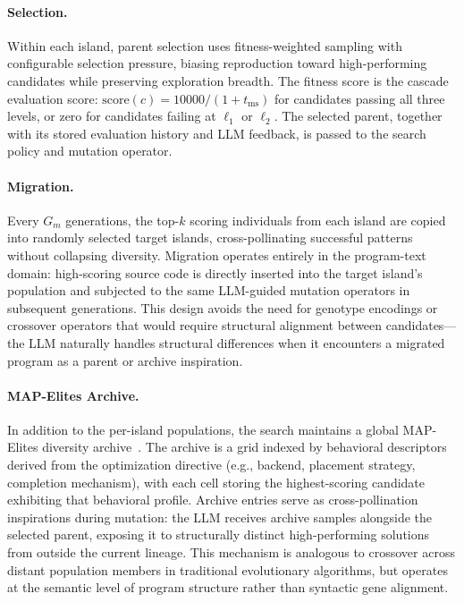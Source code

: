 \paragraph{Selection.}
Within each island, parent selection uses fitness-weighted sampling with configurable selection pressure, biasing reproduction toward high-performing candidates while preserving exploration breadth. The fitness score is the cascade evaluation score: $\text{score}(c) = 10000 / (1 + t_{\text{ms}})$ for candidates passing all three levels, or zero for candidates failing at $\ell_1$ or $\ell_2$. The selected parent, together with its stored evaluation history and LLM feedback, is passed to the search policy and mutation operator.

\paragraph{Migration.}
Every $G_m$ generations, the top-$k$ scoring individuals from each island are copied into randomly selected target islands, cross-pollinating successful patterns without collapsing diversity. Migration operates entirely in the program-text domain: high-scoring source code is directly inserted into the target island's population and subjected to the same LLM-guided mutation operators in subsequent generations. This design avoids the need for genotype encodings or crossover operators that would require structural alignment between candidates---the LLM naturally handles structural differences when it encounters a migrated program as a parent or archive inspiration.

\paragraph{MAP-Elites Archive.}
In addition to the per-island populations, the search maintains a global MAP-Elites diversity archive~\cite{mapelites}. The archive is a grid indexed by behavioral descriptors derived from the optimization directive (e.g., backend, placement strategy, completion mechanism), with each cell storing the highest-scoring candidate exhibiting that behavioral profile. Archive entries serve as cross-pollination inspirations during mutation: the LLM receives archive samples alongside the selected parent, exposing it to structurally distinct high-performing solutions from outside the current lineage. This mechanism is analogous to crossover across distant population members in traditional evolutionary algorithms, but operates at the semantic level of program structure rather than syntactic gene alignment.

